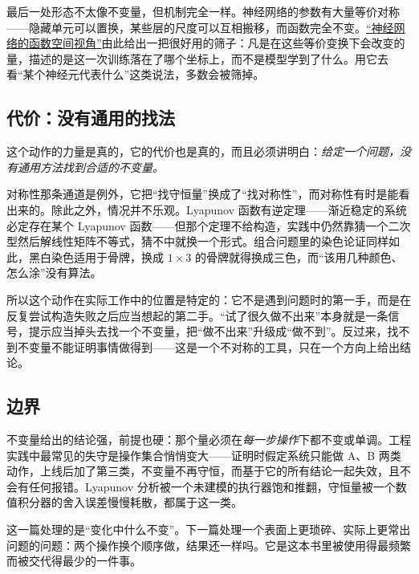 最后一处形态不太像不变量，但机制完全一样。神经网络的参数有大量等价对称——隐藏单元可以置换，某些层的尺度可以互相搬移，而函数完全不变。\hyperref[sec:14-Deep-Learning/10-Interpretability-Mathematics/01]{``神经网络的函数空间视角''}由此给出一把很好用的筛子：凡是在这些等价变换下会改变的量，描述的是这一次训练落在了哪个坐标上，而不是模型学到了什么。用它去看``某个神经元代表什么''这类说法，多数会被筛掉。

\subsection{代价：没有通用的找法}

这个动作的力量是真的，它的代价也是真的，而且必须讲明白：\emph{给定一个问题，没有通用方法找到合适的不变量。}

对称性那条通道是例外，它把``找守恒量''换成了``找对称性''，而对称性有时是能看出来的。除此之外，情况并不乐观。Lyapunov 函数有逆定理——渐近稳定的系统必定存在某个 Lyapunov 函数——但那个定理不给构造，实践中仍然靠猜一个二次型然后解线性矩阵不等式，猜不中就换一个形式。组合问题里的染色论证同样如此，黑白染色适用于骨牌，换成 \(1\times 3\) 的骨牌就得换成三色，而``该用几种颜色、怎么涂''没有算法。

所以这个动作在实际工作中的位置是特定的：它不是遇到问题时的第一手，而是在反复尝试构造失败之后应当想起的第二手。``试了很久做不出来''本身就是一条信号，提示应当掉头去找一个不变量，把``做不出来''升级成``做不到''。反过来，找不到不变量不能证明事情做得到——这是一个不对称的工具，只在一个方向上给出结论。

\subsection{边界}

不变量给出的结论强，前提也硬：那个量必须在\emph{每一步操作}下都不变或单调。工程实践中最常见的失守是操作集合悄悄变大——证明时假定系统只能做 A、B 两类动作，上线后加了第三类，不变量不再守恒，而基于它的所有结论一起失效，且不会有任何报错。Lyapunov 分析被一个未建模的执行器饱和推翻，守恒量被一个数值积分器的舍入误差慢慢耗散，都属于这一类。

这一篇处理的是``变化中什么不变''。下一篇处理一个表面上更琐碎、实际上更常出问题的问题：两个操作换个顺序做，结果还一样吗。它是这本书里被使用得最频繁而被交代得最少的一件事。
